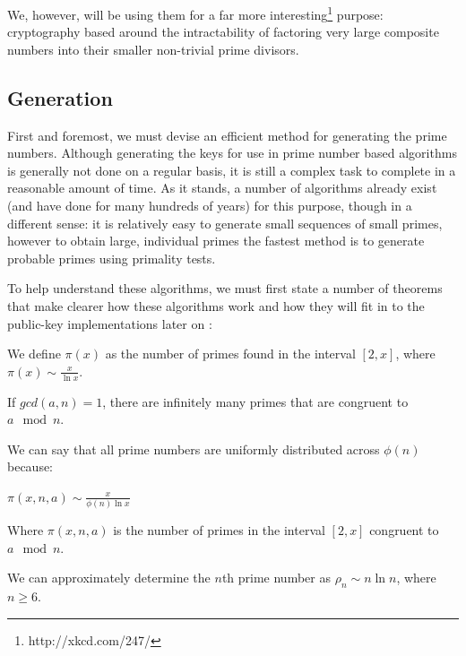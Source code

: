 We, however, will be using them for a far more interesting\footnote{http://xkcd.com/247/} purpose: cryptography based around the intractability of factoring very large composite numbers into their smaller non-trivial prime divisors.

  \subsection{Generation}
  
  First and foremost, we must devise an efficient method for generating the prime numbers. Although generating the keys for use in prime number based algorithms is generally not done on a regular basis, it is still a complex task to complete in a reasonable amount of time. As it stands, a number of algorithms already exist (and have done for many hundreds of years) for this purpose, though in a different sense: it is relatively easy to generate small sequences of small primes, however to obtain large, individual primes the fastest method is to generate probable primes using primality tests.
  
  To help understand these algorithms, we must first state a number of theorems that make clearer how these algorithms work and how they will fit in to the public-key implementations later on \cite{Alfred-Menezes:1996kx}: \\
  
  \begin{mathdef}
    We define $\pi(x)$ as the number of primes found in the interval $[2,x]$, where $\pi(x) \sim \frac{x}{\ln x}$.
  \end{mathdef}
  
  \begin{mathfact}
    If $gcd(a,n) = 1$, there are infinitely many primes that are congruent to $a \mod{n}$.
  \end{mathfact}
  
  \begin{mathfact}
    We can say that all prime numbers are uniformly distributed across $\phi(n)$ because:
    \begin{center}
    	$\pi(x,n,a) \sim \frac{x}{\phi(n) \ln x}$
    \end{center}
    Where $\pi(x,n,a)$ is the number of primes in the interval $[2,x]$ congruent to $a \mod{n}$.
  \end{mathfact}
  
  \begin{mathfact}
    We can approximately determine the $n$th prime number as $\rho_n \sim n \ln n$, where $n \geq 6$.
  \end{mathfact}
  
